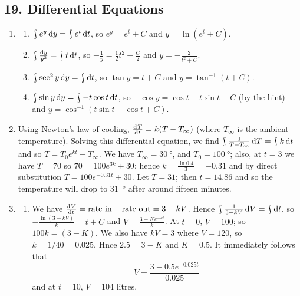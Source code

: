 \subsection*{19. Differential Equations}
\begin{enumerate}
  \item
    \begin{enumerate}
      \item $ \rint e^y \dif{y} = \rint e^t \dif{t} $, so $ e^y = e^t + C $ and $ y = \ln (e^t + C) $.
      \item $ \rint \frac{\dif{y}}{y^2} = \rint t \dif{t} $, so $ -\frac{1}{y} = \frac{1}{2} t^2 + \frac{C}{2} $ and $ y = -\frac{2}{t^2 + C} $.
      \item $ \rint \sec^2 y \dif{y} = \rint \dif{t} $, so $ \tan y = t + C $ and $ y = \tan^{-1} (t + C) $.
      \item $ \rint \sin y \dif{y} = \rint -t\cos t \dif{t} $, so $ -\cos y = \cos t - t \sin t - C $ (by the hint) and $ y = \cos^{-1} (t\sin t - \cos t + C) $.
    \end{enumerate}
  \item Using Newton's law of cooling, $ \od{T}{t} = k(T - T_\infty) $ (where $ T_\infty $ is the ambient temperature). Solving this differential
        equation, we find $ \rint \frac{1}{T - T_\infty} \dif{T} = \rint k \dif{t} $ and so $ T = T_0 e^{kt} + T_\infty $. We have $ T_\infty = \SI{30}{\degree} $,
        and $ T_0 = \SI{100}{\degree} $; also, at $ t = 3 $ we have $ T = 70 $ so $ 70 = 100e^{3k} + 30 $; hence $ k = \frac{\ln 0.4}{3} = -0.31 $ and
        by direct substitution $ T = 100e^{-0.31t} + 30 $. Let $ T = 31 $; then $ t = 14.86 $ and so the temperature will drop to \SI{31}{\degree} after
        around fifteen minutes.
  \item
    \begin{enumerate}
      \item We have $ \od{V}{t} = \text{rate in} - \text{rate out} = 3 - kV $. Hence $ \rint \frac{1}{3 - kV} \dif{V} = \rint \dif{t} $, so
            $ -\frac{\ln(3 - kV)}{k} = t + C $ and $ V = \frac{3 - Ke^{-kt}}{k} $. At $ t = 0 $, $ V = 100 $; so $ 100k = (3 - K) $. We also
            have $ kV = 3 $ where $ V = 120 $, so $ k = 1/40 = 0.025 $. Hnce $ 2.5 = 3 - K $ and $ K = 0.5 $. It immediately follows that
            \begin{displaymath}
              V = \frac{3 - 0.5e^{-0.025t}}{0.025}
            \end{displaymath}
            and at $ t = 10 $, $ V = 104 $ litres.

\end{enumerate}
\end{enumerate}
